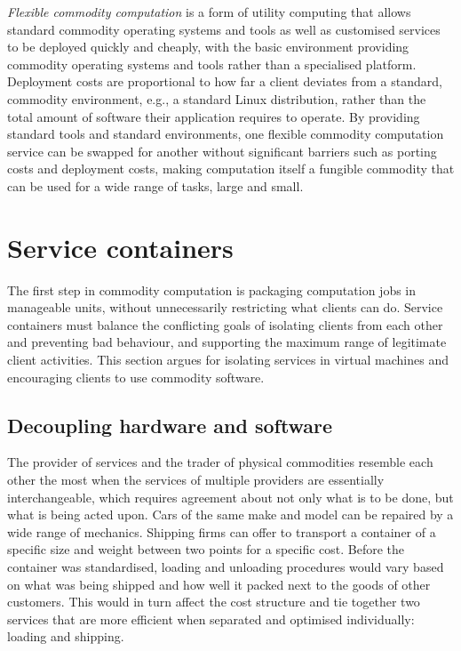\emph{Flexible commodity computation} is a form of utility computing that allows standard commodity operating systems and tools as well as customised services to be deployed quickly and cheaply, with the basic environment providing commodity operating systems and tools rather than a specialised platform. Deployment costs are proportional to how far a client deviates from a standard, commodity environment, e.g., a standard Linux distribution, rather than the total amount of software their application requires to operate. By providing standard tools and standard environments, one flexible commodity computation service can be swapped for another without significant barriers such as porting costs and deployment costs, making computation itself a fungible commodity that can be used for a wide range of tasks, large and small.

\section{Service containers}

The first step in commodity computation is packaging computation jobs in manageable units, without unnecessarily restricting what clients can do. Service containers must balance the conflicting goals of isolating clients from each other and preventing bad behaviour, and supporting the maximum range of legitimate client activities. This section argues for isolating services in virtual machines and encouraging clients to use commodity software.

\subsection{Decoupling hardware and software}

The provider of services and the trader of physical commodities resemble each other the most when the services of multiple providers are essentially interchangeable, which requires agreement about not only what is to be done, but what is being acted upon. Cars of the same make and model can be repaired by a wide range of mechanics. Shipping firms can offer to transport a container of a specific size and weight between two points for a specific cost. Before the container was standardised, loading and unloading procedures would vary based on what was being shipped and how well it packed next to the goods of other customers. This would in turn affect the cost structure and tie together two services that are more efficient when separated and optimised individually: loading and shipping.

